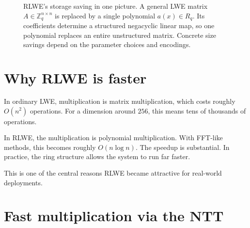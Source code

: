 \begin{figure}[H]
\centering
{}
\caption{RLWE's storage saving in one picture. A general LWE matrix $A\in\mathbb{Z}_q^{n\times n}$ is replaced by a single polynomial $a(x)\in R_q$. Its coefficients determine a structured negacyclic linear map, so one polynomial replaces an entire unstructured matrix. Concrete size savings depend on the parameter choices and encodings.}
\label{fig:rlwe-compression}
\end{figure}

\section{Why RLWE is faster}

In ordinary LWE, multiplication is matrix multiplication, which costs roughly $O(n^2)$ operations. For a dimension around $256$, this means tens of thousands of operations.

In RLWE, the multiplication is polynomial multiplication. With FFT-like methods, this becomes roughly $O(n\log n)$. The speedup is substantial. In practice, the ring structure allows the system to run far faster.

This is one of the central reasons RLWE became attractive for real-world deployments.

\section{Fast multiplication via the NTT}

